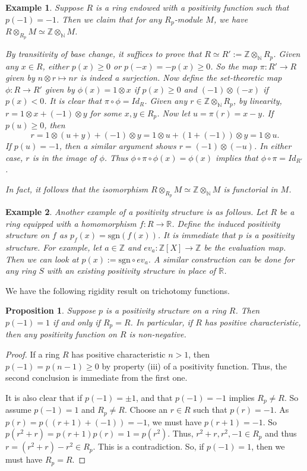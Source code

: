 \documentclass[notitlepage, 10pt]{article}
\theoremstyle{defin}
\newtheorem{eg}{Example}[section]
\theoremstyle{theo}
\newtheorem{prop}[defn]{Proposition}
\theoremstyle{rema}
\newcommand{\R}{\mathbb{R}}
\newcommand{\N}{\mathbb{N}}
\newcommand{\Z}{\mathbb{Z}}
\begin{document}
\begin{eg}\label{eg:tensorposp-1}
    Suppose $R$ is a ring endowed with a positivity function such that $p(-1)=-1$. Then we claim that for any $R_p$-module $M$, we have $R\otimes_{R_p} M \simeq \Z \otimes_\N M$.

    By transitivity of base change, it suffices to prove that $R \simeq R':=\Z\otimes_\N R_p$. Given any $x\in R$, either $p(x)\geq 0$ or $p(-x)=-p(x)\geq 0$. So the map $\pi : R' \to R$ given by $n\otimes r \mapsto nr$ is indeed a surjection. Now define the set-theoretic map $\phi: R \to R'$ given by $\phi(x) = 1\otimes x$ if $p(x)\geq 0$ and $(-1)\otimes (-x)$ if $p(x)<0$. It is clear that $\pi \circ \phi = Id_R$. Given any $r\in \Z\otimes_\N R_p$, by linearity, $r = 1\otimes x+(-1)\otimes y$ for some $x,y\in R_p$. Now let $u =\pi(r) = x-y$. If $p(u)\geq 0$, then 
    $$r =  1\otimes (u+y) + (-1)\otimes y = 1\otimes u + (1+(-1))\otimes y = 1\otimes u.$$ 
    If $p(u) = -1$, then a similar argument shows $r = (-1)\otimes (-u)$. In either case, $r$ is in the image of $\phi$. Thus $\phi \circ \pi \circ \phi (x) = \phi(x)$ implies that $\phi \circ \pi = Id_{R'}$.
    
    In fact, it follows that the isomorphism $R\otimes_{R_p} M \simeq \Z \otimes_\N M$ is functorial in $M$.
\end{eg}

\begin{eg}
    Another example of a positivity structure is as follows. Let $R$ be a ring equipped with a homomorphism $f: R \to \R$. Define the \textit{induced positivity structure} on $f$ as $p_f(x) = \mathrm{sgn}(f(x))$. It is immediate that $p$ is a positivity structure. For example, let $a\in \Z$ and $ev_a : \Z[X] \to \Z$ be the evaluation map. Then we can look at $p(x) := \mathrm{sgn} \circ ev_a$. A similar construction can be done for any ring $S$ with an existing positivity structure in place of $\R$.
\end{eg}

We have the following rigidity result on trichotomy functions.

\begin{prop}
    \label{p:trichotomyimpliessign}
    Suppose $p$ is a positivity structure on a ring $R$. Then $p(-1)=1$ if and only if $R_p=R$. In particular, if $R$ has positive characteristic, then any positivity function on $R$ is non-negative. 
\end{prop}

\begin{proof}
    If a ring $R$ has positive characteristic $n>1$, then $p(-1)=p(n-1)\geq 0$ by property (iii) of a positivity function. Thus, the second conclusion is immediate from the first one.

    It is also clear that if $p(-1)=\pm 1$, and that $p(-1)=-1$ implies $R_p\neq R$. So assume $p(-1)=1$ and $R_p\neq R$. Choose an $r\in R$ such that $p(r) = -1$. As $p(r) = p((r+1)+(-1)) = -1$, we must have $p(r+1)=-1$. So $p(r^2+r) = p(r+1)p(r) = 1 = p(r^2)$. Thus, $r^2+r, r^2, -1 \in R_p$ and thus $r=(r^2+r)-r^2 \in R_p$. This is a contradiction. So, if $p(-1)=1$, then we must have $R_p=R$.
\end{proof}
\end{document}
